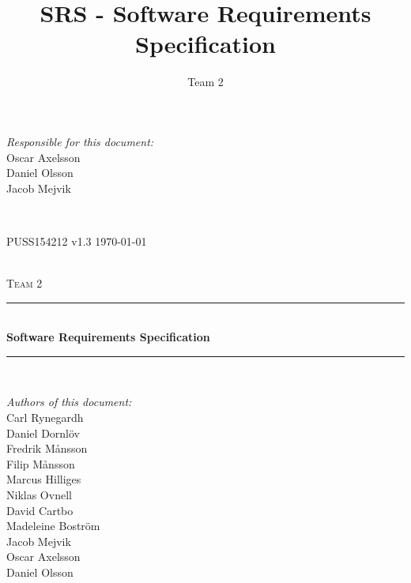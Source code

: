 \documentclass[a4paper]{article}
\title{SRS - Software Requirements Specification}
\author{Team 2}
\begin{document}
\begin{titlepage}
\newcommand{\HRule}{\rule{\linewidth}{0.5mm}}

\begin{minipage}{0.5\textwidth}
\begin{flushleft} %
\textit{Responsible for this document:}\\
Oscar Axelsson \\
Daniel Olsson \\
Jacob Mejvik
\end{flushleft}
\end{minipage}
~
\begin{minipage}{0.4\textwidth}
\begin{flushright}
PUSS154212 v1.3
\today
\end{flushright}
\end{minipage}\\[3cm]

\centering
\textsc{\LARGE Team 2}\\[0.5cm]

\HRule \\[0.4cm]
{ \huge \bfseries Software Requirements Specification}\\[0.4cm] %
\HRule \\[1.5cm]

\vfill
\begin{flushleft}
\textit{Authors of this document:}\\
Carl Rynegardh \\
Daniel Dornlöv \\
Fredrik Månsson \\
Filip Månsson \\
Marcus Hilliges \\
Niklas Ovnell \\
David Cartbo \\
Madeleine Boström \\
Jacob Mejvik \\
Oscar Axelsson \\
Daniel Olsson
\end{flushleft}



\end{titlepage}
\setcounter{tocdepth}{2}
\end{document}
